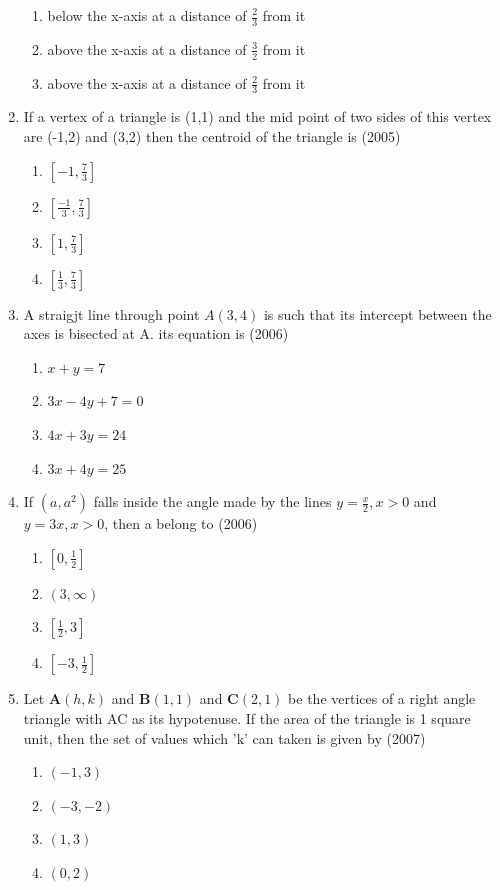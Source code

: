 \documentclass[12pt]{article}
\providecommand{\sbrak}[1]{\ensuremath{{}\left[#1\right]}}
\let\vec\mathbf
\begin{document}
\begin{enumerate}
\begin{enumerate}
\item below the x-axis at a distance of $\frac{2}{3}$ from it
\item above the x-axis at a distance of $\frac{3}{2}$ from it
\item above the x-axis at a distance of $\frac{2}{3}$ from it
\end{enumerate}
\item If a vertex of a triangle is (1,1) and the mid point of two sides of this vertex are (-1,2) and (3,2) then the centroid of the triangle is (2005)
\begin{enumerate}
\item $\sbrak{-1,\frac{7}{3}}$ 
\item $\sbrak{\frac{-1}{3},\frac{7}{3}}$ 
\item $\sbrak{1,\frac{7}{3}}$  
\item $\sbrak{\frac{1}{3},\frac{7}{3}}$ 
\end{enumerate}
\item A straigjt line through point $A(3,4)$ is such that its intercept between the axes is bisected at A. its equation is (2006)
\begin{enumerate}
\item $x+y=7$ 
\item $3x-4y+7=0$  
\item $4x+3y=24$ 
\item $3x+4y=25$
\end{enumerate}
\item If $(a,a^2)$ falls inside the angle made by the lines $y= \frac{x}{2}, x>0$ and $y=3x, x>0$, then a belong to (2006)
\begin{enumerate}
\item $\sbrak{0,\frac{1}{2}}$ 
\item $(3,\infty)$ 
\item $\sbrak{\frac{1}{2},3}$ 
\item $\sbrak{-3,\frac{1}{2}}$
\end{enumerate}
\item Let $\vec{A}(h,k)$ and $\vec{B}(1,1)$ and $\vec{C}(2,1)$ be the vertices of a right angle triangle with AC as its hypotenuse. If the area of the triangle is 1 square unit, then the set of values which 'k' can taken is given by (2007)
\begin{enumerate}
\item $(-1,3)$ 
\item $(-3,-2)$
\item $(1,3)$ 
\item $(0,2)$
\end{enumerate}

\end{enumerate}
\end{document}
